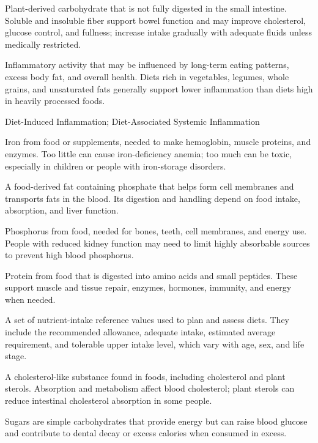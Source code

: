  Plant-derived carbohydrate that is not fully digested in the small intestine. Soluble and insoluble fiber support bowel function and may improve cholesterol, glucose control, and fullness; increase intake gradually with adequate fluids unless medically restricted.

 Inflammatory activity that may be influenced by long-term eating patterns, excess body fat, and overall health. Diets rich in vegetables, legumes, whole grains, and unsaturated fats generally support lower inflammation than diets high in heavily processed foods.

\synonyms
Diet-Induced Inflammation; Diet-Associated Systemic Inflammation

 Iron from food or supplements, needed to make hemoglobin, muscle proteins, and enzymes. Too little can cause iron-deficiency anemia; too much can be toxic, especially in children or people with iron-storage disorders.

 A food-derived fat containing phosphate that helps form cell membranes and transports fats in the blood. Its digestion and handling depend on food intake, absorption, and liver function.

 Phosphorus from food, needed for bones, teeth, cell membranes, and energy use. People with reduced kidney function may need to limit highly absorbable sources to prevent high blood phosphorus.

 Protein from food that is digested into amino acids and small peptides. These support muscle and tissue repair, enzymes, hormones, immunity, and energy when needed.

 A set of nutrient-intake reference values used to plan and assess diets. They include the recommended allowance, adequate intake, estimated average requirement, and tolerable upper intake level, which vary with age, sex, and life stage.

 A cholesterol-like substance found in foods, including cholesterol and plant sterols. Absorption and metabolism affect blood cholesterol; plant sterols can reduce intestinal cholesterol absorption in some people.

 Sugars are simple carbohydrates that provide energy but can raise blood glucose and contribute to dental decay or excess calories when consumed in excess.

